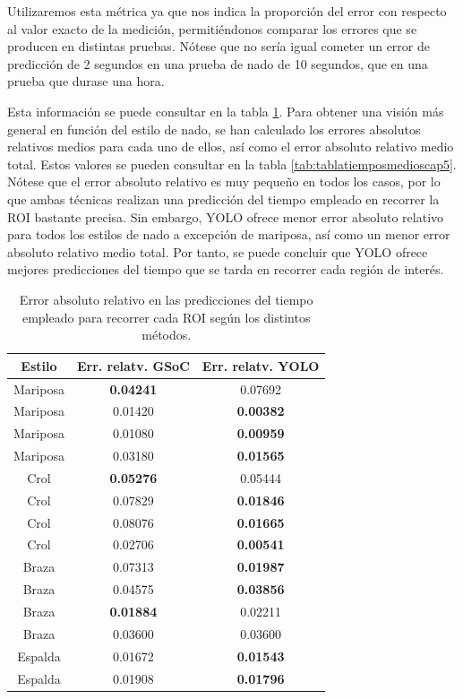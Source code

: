 Utilizaremos esta métrica ya que nos indica la proporción del error con respecto al valor exacto de la medición, permitiéndonos comparar los errores que se producen en distintas pruebas. Nótese que no sería igual cometer un error de predicción de 2 segundos en una prueba de nado de 10 segundos, que en una prueba que durase una hora.

Esta información se puede consultar en la tabla \ref{tab:tablaerrorestiemposcap5}. Para obtener una visión más general en función del estilo de nado, se han calculado los errores absolutos relativos medios para cada uno de ellos, así como el error absoluto relativo medio total. Estos valores se pueden consultar en la tabla \ref{tab:tablatiemposmedioscap5}. Nótese que el error absoluto relativo es muy pequeño en todos los casos, por lo que ambas técnicas realizan una predicción del tiempo empleado en recorrer la ROI bastante precisa. Sin embargo, YOLO ofrece menor error absoluto relativo para todos los estilos de nado a excepción de mariposa, así como un menor error absoluto relativo  medio total. Por tanto, se puede concluir que YOLO ofrece mejores predicciones del tiempo que se tarda en recorrer cada región de interés.

\begin{table}[]
    \centering
    \small
    \begin{tabular}{|c|c|c|} \hline
         Estilo & Err. relatv. GSoC & Err. relatv. YOLO  \\ \hline 
         Mariposa & \textbf{0.04241} & 0.07692 \\
         Mariposa & 0.01420 & \textbf{0.00382} \\
         Mariposa & 0.01080 & \textbf{0.00959} \\
         Mariposa & 0.03180 & \textbf{0.01565} \\
         Crol & \textbf{0.05276} & 0.05444 \\
         Crol & 0.07829 & \textbf{0.01846} \\
         Crol & 0.08076 & \textbf{0.01665} \\
         Crol & 0.02706 & \textbf{0.00541} \\
         Braza & 0.07313 & \textbf{0.01987} \\
         Braza & 0.04575 & \textbf{0.03856} \\
         Braza & \textbf{0.01884} & 0.02211 \\
         Braza & 0.03600 & 0.03600 \\
         Espalda & 0.01672 & \textbf{0.01543} \\
         Espalda & 0.01908 & \textbf{0.01796} \\ \hline
    \end{tabular}
    \caption{Error absoluto relativo en las predicciones del tiempo empleado para recorrer cada ROI según los distintos métodos. }
    \label{tab:tablaerrorestiemposcap5}
\end{table}

